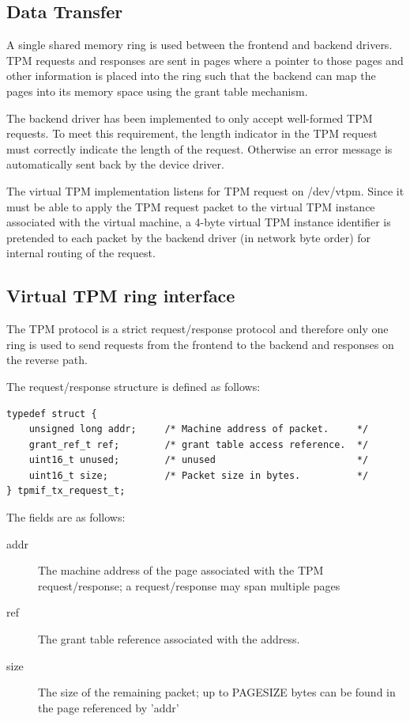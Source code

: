 \documentclass[11pt,twoside,final,openright,a4paper]{report}
\begin{document}
\subsection{Data Transfer}

A single shared memory ring is used between the frontend and backend
drivers. TPM requests and responses are sent in pages where a pointer
to those pages and other information is placed into the ring such that
the backend can map the pages into its memory space using the grant
table mechanism.

The backend driver has been implemented to only accept well-formed
TPM requests. To meet this requirement, the length indicator in the
TPM request must correctly indicate the length of the request.
Otherwise an error message is automatically sent back by the device driver.

The virtual TPM implementation listens for TPM request on /dev/vtpm. Since
it must be able to apply the TPM request packet to the virtual TPM instance
associated with the virtual machine, a 4-byte virtual TPM instance
identifier is pretended to each packet by the backend driver (in network
byte order) for internal routing of the request.

\subsection{Virtual TPM ring interface}

The TPM protocol is a strict request/response protocol and therefore
only one ring is used to send requests from the frontend to the backend
and responses on the reverse path.

The request/response structure is defined as follows:

\scriptsize
\begin{verbatim}
typedef struct {
    unsigned long addr;     /* Machine address of packet.     */
    grant_ref_t ref;        /* grant table access reference.  */
    uint16_t unused;        /* unused                         */
    uint16_t size;          /* Packet size in bytes.          */
} tpmif_tx_request_t;
\end{verbatim}
\normalsize

The fields are as follows:

\begin{description}
\item[addr] The machine address of the page associated with the TPM
            request/response; a request/response may span multiple
            pages
\item[ref]  The grant table reference associated with the address.
\item[size] The size of the remaining packet; up to
            PAGE{\textunderscore}SIZE bytes can be found in the
            page referenced by 'addr'
\end{description}
\end{document}
